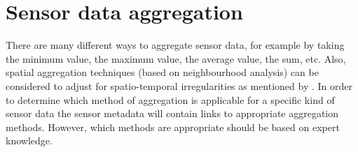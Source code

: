 
\section{Sensor data aggregation}
There are many different ways to aggregate sensor data, for example by taking the minimum value, the maximum value, the average value, the sum, etc. Also, spatial aggregation techniques (based on neighbourhood analysis) can be considered to adjust for spatio-temporal irregularities as mentioned by \cite{SW:Ganesan}. In order to determine which method of aggregation is applicable for a specific kind of sensor data the sensor metadata will contain links to appropriate aggregation methods. However, which methods are appropriate should be based on expert knowledge.

